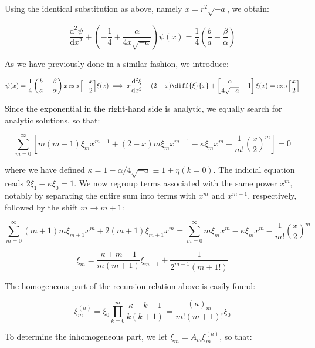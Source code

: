 Using the identical substitution as above, namely $x=r^2\sqrt{-a}$, we obtain:

\begin{equation}
    \frac{\mathrm{d}^2\psi}{\mathrm{d}x^2}+\left(-\frac{1}{4}+\frac{\alpha}{4x\sqrt{-a}}\right)\psi(x)=\frac{1}{4}\left(\frac{b}{a}-\frac{\beta}{\alpha}\right)
\end{equation}

As we have previously done in a similar fashion, we introduce:

\begin{equation}
    \psi(x)=\frac{1}{4}\left(\frac{b}{a}-\frac{\beta}{\alpha}\right)x\exp{\left[-\frac{x}{2}\right]}\xi(x)\implies x\frac{\mathrm{d}^2\xi}{\mathrm{d}x^2}+(2-x)\diff{\xi}{x}+\left[\frac{\alpha}{4\sqrt{-a}}-1\right]\xi(x)=\exp{\left[\frac{x}{2}\right]}
\end{equation}

Since the exponential in the right-hand side is analytic, we equally search for analytic solutions, so that:

\begin{equation}
    \sum_{m=0}^\infty\left[m(m-1)\xi_mx^{m-1}+(2-x) m\xi_mx^{m-1}-\kappa\xi_mx^m-\frac{1}{m!}\left(\frac{x}{2}\right)^m\right]=0
\end{equation}

where we have defined $\kappa=1-\alpha/4\sqrt{-a}\equiv1+\eta(k=0)$. The indicial equation reads $2\xi_1-\kappa\xi_0=1$. We now regroup terms associated with the same power $x^m$, notably by separating the entire sum into terms with $x^m$ and $x^{m-1}$, respectively, followed by the shift $m\to m+1$:

\begin{equation}
    \sum_{m=0}^\infty(m+1)m\xi_{m+1}x^{m}+2(m+1)\xi_{m+1}x^{m}=\sum_{m=0}^\infty m\xi_mx^{m}-\kappa\xi_mx^m-\frac{1}{m!}\left(\frac{x}{2}\right)^m
\end{equation}

\begin{equation}
    \xi_{m}=\frac{\kappa+m-1}{m(m+1)}\xi_{m-1}+\frac{1}{2^{m-1}(m+1!)}
\end{equation}

The homogeneous part of the recursion relation above is easily found:

\begin{equation}
    \xi_m^{(h)}=\xi_0\prod_{k=0}^m\frac{\kappa+k-1}{k(k+1)}=\frac{(\kappa)_m}{m!(m+1)!}\xi_0
\end{equation}

To determine the inhomogeneous part, we let $\xi_m=A_m\xi_m^{(h)}$, so that:

